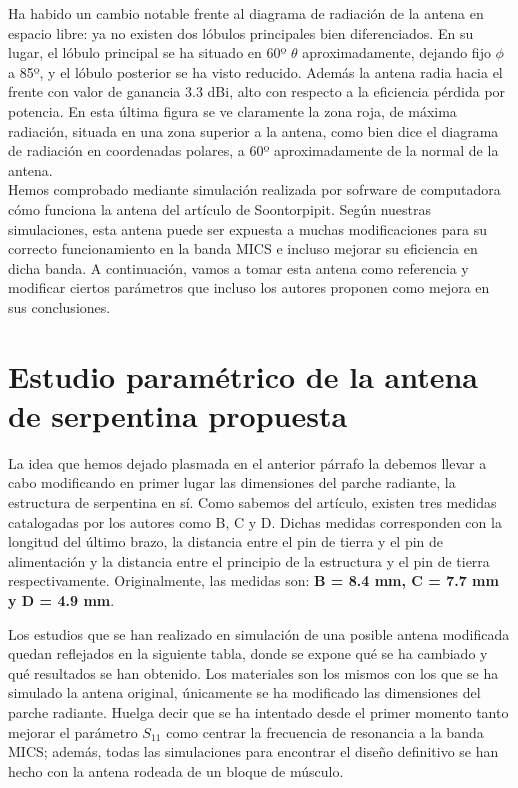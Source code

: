 Ha habido un cambio notable frente al diagrama de radiación de la antena en espacio libre: ya no existen dos lóbulos principales bien diferenciados. En su lugar, el lóbulo principal se ha situado en 60º $\theta$ aproximadamente, dejando fijo $\phi$ a 85º, y el lóbulo posterior se ha visto reducido. Además la antena radia hacia el frente con valor de ganancia 3.3 dBi, alto con respecto a la eficiencia pérdida por potencia.
En esta última figura se ve claramente la zona roja, de máxima radiación, situada en una zona superior a la antena, como bien dice el diagrama de radiación en coordenadas polares, a 60º aproximadamente de la normal de la antena.\\

Hemos comprobado mediante simulación realizada por sofrware de computadora cómo funciona la antena del artículo de Soontorpipit. Según nuestras simulaciones, esta antena puede ser expuesta a muchas modificaciones para su correcto funcionamiento en la banda MICS e incluso mejorar su eficiencia en dicha banda. A continuación, vamos a tomar esta antena como referencia y modificar ciertos parámetros que incluso los autores proponen como mejora en sus conclusiones.


\section{Estudio paramétrico de la antena de serpentina propuesta}\label{sec:modificado}

La idea que hemos dejado plasmada en el anterior párrafo la debemos llevar a cabo modificando en primer lugar las dimensiones del parche radiante, la estructura de serpentina en sí. Como sabemos del artículo, existen tres medidas catalogadas por los autores como B, C y D. Dichas medidas corresponden con la longitud del último brazo, la distancia entre el pin de tierra y el pin de alimentación y la distancia entre el principio de la estructura y el pin de tierra respectivamente. Originalmente, las medidas son: \textbf{B = 8.4 mm, C = 7.7 mm y D = 4.9 mm}.

Los estudios que se han realizado en simulación de una posible antena modificada quedan reflejados en la siguiente tabla, donde se expone qué se ha cambiado y qué resultados se han obtenido. Los materiales son los mismos con los que se ha simulado la antena original, únicamente se ha modificado las dimensiones del parche radiante. Huelga decir que se ha intentado desde el primer momento tanto mejorar el parámetro $S_{11}$ como centrar la frecuencia de resonancia a la banda MICS; además, todas las simulaciones para encontrar el diseño definitivo se han hecho con la antena rodeada de un bloque de músculo.

